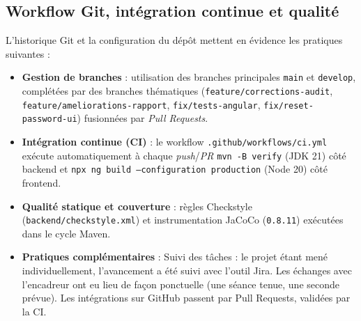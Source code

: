 \subsection{Workflow Git, intégration continue et qualité}
L'historique Git et la configuration du dépôt mettent en évidence les pratiques suivantes :
\begin{itemize}
    \item \textbf{Gestion de branches} : utilisation des branches principales \texttt{main} et \texttt{develop}, complétées par des branches thématiques (\texttt{feature/corrections-audit}, \texttt{feature/ameliorations-rapport}, \texttt{fix/tests-angular}, \texttt{fix/reset-password-ui}) fusionnées par \textit{Pull Requests}.
    \item \textbf{Intégration continue (CI)} : le workflow \texttt{.github/workflows/ci.yml} exécute automatiquement à chaque \textit{push}/\textit{PR} \texttt{mvn -B verify} (JDK 21) côté backend et \texttt{npx ng build --configuration production} (Node 20) côté frontend.
    \item \textbf{Qualité statique et couverture} : règles Checkstyle (\texttt{backend/checkstyle.xml}) et instrumentation JaCoCo (\texttt{0.8.11}) exécutées dans le cycle Maven.
    \item \textbf{Pratiques complémentaires} : Suivi des tâches : le projet étant mené individuellement, l'avancement a été suivi avec l'outil Jira. Les échanges avec l'encadreur ont eu lieu de façon ponctuelle (une séance tenue, une seconde prévue). Les intégrations sur GitHub passent par Pull Requests, validées par la CI.
\end{itemize}


